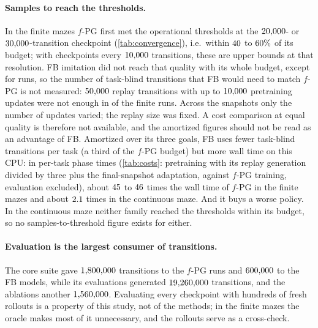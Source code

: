 \paragraph{Samples to reach the thresholds.}
In the finite mazes $f$-PG first met the operational thresholds at the $\vn{abs.fpg.first.lo}{20{,}000}$- or $\vn{abs.fpg.first.hi}{30{,}000}$-transition checkpoint (\cref{tab:convergence}), i.e.\ within $\vn{s14.pct.lo}{40}$ to $\vn{s14.pct.hi}{60}\%$ of its budget; with checkpoints every $\vn{fpg.interval.f}{10{,}000}$ transitions, these are upper bounds at that resolution.
FB imitation did not reach that quality with its whole budget, except for  \ERFB{} runs, so the number of task-blind transitions that FB would need to match $f$-PG is not measured: $\vn{replay.f}{50{,}000}$ replay transitions with up to $\vn{fb.updates.f}{10{,}000}$ pretraining updates were not enough in  of the  finite runs. Across the snapshots only the number of updates varied; the replay size was fixed.
A cost comparison at equal quality is therefore not available, and the amortized figures should not be read as an advantage of FB.
Amortized over its three goals, FB uses fewer task-blind transitions per task (a third of the $f$-PG budget) but more wall time on this CPU: in per-task phase times (\cref{tab:costs}: pretraining with its replay generation divided by three plus the final-snapshot adaptation, against $f$-PG training, evaluation excluded), about $\vn{s14.ratio.f.lo}{45}$ to $\vn{s14.ratio.f.hi}{46}$ times the wall time of $f$-PG in the finite mazes and about $\vn{s14.ratio.c}{2.1}$ times in the continuous maze. And it buys a worse policy.
In the continuous maze neither family reached the thresholds within its budget, so no samples-to-threshold figure exists for either.

\paragraph{Evaluation is the largest consumer of transitions.}
The core suite gave $\vn{s14.fpg.tr}{1{,}800{,}000}$ transitions to the  $f$-PG runs and $\vn{s14.fb.tr}{600{,}000}$ to the  FB models, while its evaluations generated $\vn{s14.eval.tr}{19{,}260{,}000}$ transitions, and the ablations another $\vn{s14.abl.eval.tr}{1{,}560{,}000}$.
Evaluating every checkpoint with hundreds of fresh rollouts is a property of this study, not of the methods; in the finite mazes the oracle makes most of it unnecessary, and the rollouts serve as a cross-check.


